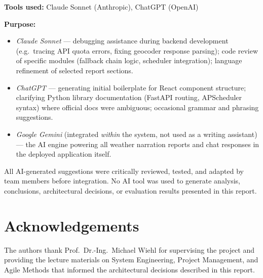\documentclass[11pt, a4paper]{article}
\begin{document}
\medskip
\noindent\textbf{Tools used:} Claude Sonnet (Anthropic), ChatGPT (OpenAI)

\medskip
\noindent\textbf{Purpose:}
\begin{itemize}[noitemsep]
  \item \textit{Claude Sonnet} — debugging assistance during backend development
        (e.g.\ tracing API quota errors, fixing geocoder response parsing);
        code review of specific modules (fallback chain logic, scheduler integration);
        language refinement of selected report sections.
  \item \textit{ChatGPT} — generating initial boilerplate for React component structure;
        clarifying Python library documentation (FastAPI routing, APScheduler syntax)
        where official docs were ambiguous; occasional grammar and phrasing suggestions.
  \item \textit{Google Gemini} (integrated \emph{within} the system, not used as a
        writing assistant) — the AI engine powering all weather narration reports
        and chat responses in the deployed application itself.
\end{itemize}

\medskip
\noindent All AI-generated suggestions were critically reviewed, tested, and adapted by
team members before integration. No AI tool was used to generate analysis, conclusions,
architectural decisions, or evaluation results presented in this report.

\section*{Acknowledgements}

The authors thank Prof.~Dr.-Ing.~Michael Wiehl for supervising the project and providing
the lecture materials on System Engineering, Project Management, and Agile Methods that
informed the architectural decisions described in this report.
\end{document}
